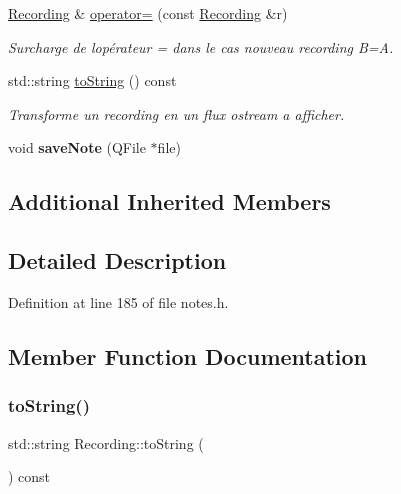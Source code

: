 \begin{DoxyCompactItemize}
\item 
\mbox{\label{class_recording_ac5c7522d695c8a657f5e801df97a9e06}} 
\hyperlink{class_recording}{Recording} \& \hyperlink{class_recording_ac5c7522d695c8a657f5e801df97a9e06}{operator=} (const \hyperlink{class_recording}{Recording} \&r)
\begin{DoxyCompactList}\small\item\em Surcharge de l\textquotesingle{}opérateur = dans le cas nouveau recording B=A. \end{DoxyCompactList}\item 
std\+::string \hyperlink{class_recording_a9f403a39bec2db40c9171a6c3a20942d}{to\+String} () const
\begin{DoxyCompactList}\small\item\em Transforme un recording en un flux ostream a afficher. \end{DoxyCompactList}\item 
\mbox{\label{class_recording_a99e10c8a8c13bce5f70195b6c30a1cc9}} 
void {\bfseries save\+Note} (Q\+File $\ast$file)
\end{DoxyCompactItemize}
\subsection*{Additional Inherited Members}


\subsection{Detailed Description}


Definition at line 185 of file notes.\+h.



\subsection{Member Function Documentation}
\mbox{\label{class_recording_a9f403a39bec2db40c9171a6c3a20942d}} 
\subsubsection{\texorpdfstring{to\+String()}{toString()}}
{\footnotesize\ttfamily std\+::string Recording\+::to\+String (\begin{DoxyParamCaption}{ }\end{DoxyParamCaption}) const\hspace{0.3cm}{\ttfamily [virtual]}}



